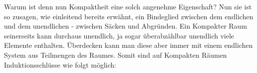  Warum ist denn nun Kompaktheit eine solch angenehme Eigenschaft? Nun sie ist so zusagen, wie einleitend bereits erwähnt, 
 ein Bindeglied zwischen dem endlichen und dem unendlichen - zwischen Säcken und Abgründen. Ein Kompakter Raum seinerseits 
 kann durchaus unendlich, ja sogar überabzählbar unendlich viele Elemente enthalten. Überdecken kann man diese aber immer mit
 einem endlichen System aus Teilmengen des Raumes. Somit sind auf Kompakten Räumen Induktionsschlüsse wie folgt möglich:
 

